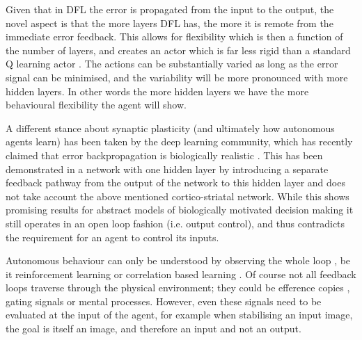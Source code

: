 \documentclass{aamas2018}
\begin{document}
Given that in DFL the error is propagated from the input to the
output, the novel aspect is that the more layers DFL has, the more it
is remote from the immediate error feedback. This allows for
flexibility which is then a function of the number of layers, and
creates an actor which is far less rigid than a standard Q learning
actor \cite{Dayan1992}. The actions can be substantially varied as
long as the error signal can be minimised, and the variability will be
more pronounced with more hidden layers. In other words the more
hidden layers we have the more behavioural flexibility the agent will
show.

A different stance about synaptic plasticity (and ultimately how
autonomous agents learn) has been taken by the deep learning
community, which has recently claimed that error backpropagation is
biologically realistic \cite{Lillicrap2016,Roelfsema2018}. This has
been demonstrated in a network with one hidden layer by introducing a
separate feedback pathway from the output of the network to this
hidden layer and does not take account the above mentioned
cortico-striatal network. While this shows promising results for
abstract models of biologically motivated decision making it still
operates in an open loop fashion (i.e. output control), and thus
contradicts the requirement for an agent to control its inputs.

Autonomous behaviour can only be understood by observing the whole
loop \cite{Porr2005kyb}, be it reinforcement learning \cite{Sutton98}
or correlation based learning \cite{Verschure91}. Of course not all
feedback loops traverse through the physical environment; they could
be efference copies \cite{Uexkuell26,Graesser86}, gating signals or
mental processes. However, even these signals need to be evaluated at
the input of the agent, for example when stabilising an input image,
the goal is itself an image, and therefore an input and not an output.




\end{document}

